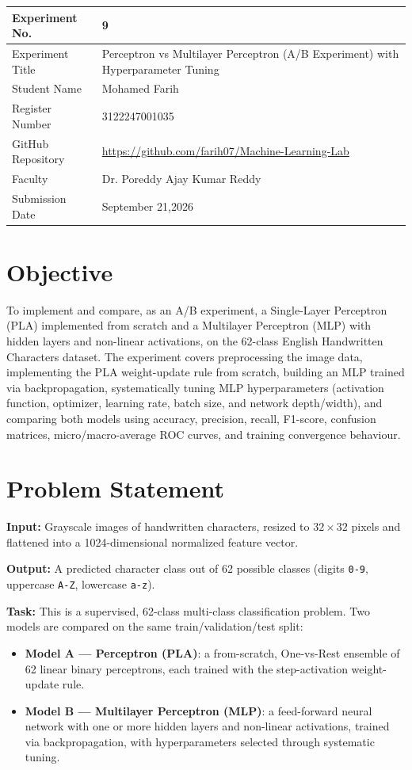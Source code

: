\documentclass[12pt,a4paper]{article}
\begin{document}
\begin{tabular}{|p{4cm}|p{11cm}|}
\hline
Experiment No. & 9 \\ \hline
Experiment Title & Perceptron vs Multilayer Perceptron (A/B Experiment) with Hyperparameter Tuning \\ \hline
Student Name & Mohamed Farih \\ \hline
Register Number & 3122247001035 \\ \hline
GitHub Repository & \url{https://github.com/farih07/Machine-Learning-Lab} \\ \hline
Faculty & Dr. Poreddy Ajay Kumar Reddy \\ \hline
Submission Date & September 21,2026 \\ \hline
\end{tabular}


\section{Objective}
To implement and compare, as an A/B experiment, a Single-Layer Perceptron (PLA) implemented from
scratch and a Multilayer Perceptron (MLP) with hidden layers and non-linear activations, on the
62-class English Handwritten Characters dataset. The experiment covers preprocessing the image
data, implementing the PLA weight-update rule from scratch, building an MLP trained via
backpropagation, systematically tuning MLP hyperparameters (activation function, optimizer,
learning rate, batch size, and network depth/width), and comparing both models using accuracy,
precision, recall, F1-score, confusion matrices, micro/macro-average ROC curves, and training
convergence behaviour.

\section{Problem Statement}
\textbf{Input:} Grayscale images of handwritten characters, resized to $32\times32$ pixels and
flattened into a 1024-dimensional normalized feature vector.

\textbf{Output:} A predicted character class out of 62 possible classes (digits \texttt{0-9},
uppercase \texttt{A-Z}, lowercase \texttt{a-z}).

\textbf{Task:} This is a supervised, 62-class multi-class classification problem. Two models are
compared on the same train/validation/test split:
\begin{itemize}[nosep]
\item \textbf{Model A — Perceptron (PLA)}: a from-scratch, One-vs-Rest ensemble of 62 linear
binary perceptrons, each trained with the step-activation weight-update rule.
\item \textbf{Model B — Multilayer Perceptron (MLP)}: a feed-forward neural network with one or
more hidden layers and non-linear activations, trained via backpropagation, with hyperparameters
selected through systematic tuning.
\end{itemize}
\end{document}
